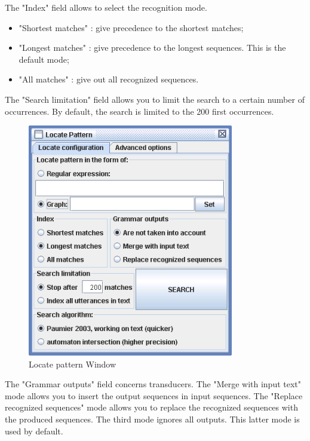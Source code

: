 \bigskip
\noindent The "Index" field allows to select the recognition mode.

\bigskip
{}
\begin{itemize}
  \item "Shortest matches" : give precedence to the shortest matches;
  \item "Longest matches" : give precedence to the longest sequences. This is the
  default mode;
  \item "All matches" : give out all recognized sequences.
\end{itemize}

\bigskip
\noindent 
The "Search limitation" field allows you to limit the search to a certain number of
occurrences. By default, the search is limited to the 200 first
occurrences.

\bigskip
\begin{figure}[!h]
\begin{center}
\includegraphics[width=9cm]{resources/img/fig6-30.png}
\caption{Locate pattern Window\label{fig-regexp-frame}}
\end{center}
\end{figure}

\noindent The "Grammar outputs" field concerns transducers. The "Merge with
input text" mode allows you to insert the output sequences in input sequences.
The "Replace recognized sequences" mode allows you to replace the 
recognized sequences with the produced sequences. The third mode ignores all
outputs. This latter mode is used by default.

